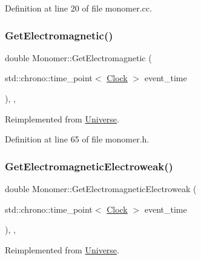 Definition at line 20 of file monomer.\+cc.

\mbox{\label{class_monomer_ad23f4829d66cb20401cc72a9d72ac320}} 
\subsubsection{\texorpdfstring{Get\+Electromagnetic()}{GetElectromagnetic()}}
{\footnotesize\ttfamily double Monomer\+::\+Get\+Electromagnetic (\begin{DoxyParamCaption}\item[{std\+::chrono\+::time\+\_\+point$<$ \mbox{\hyperlink{universe_8h_a0ef8d951d1ca5ab3cfaf7ab4c7a6fd80}{Clock}} $>$}]{event\+\_\+time }\end{DoxyParamCaption})\hspace{0.3cm}{\ttfamily [inline]}, {\ttfamily [final]}, {\ttfamily [virtual]}}



Reimplemented from \mbox{\hyperlink{class_universe_a63b850ef3f3394313353109d222bf5d1}{Universe}}.



Definition at line 65 of file monomer.\+h.

\mbox{\label{class_monomer_a9b270cd1293bc9635813ead284bd3881}} 
\subsubsection{\texorpdfstring{Get\+Electromagnetic\+Electroweak()}{GetElectromagneticElectroweak()}}
{\footnotesize\ttfamily double Monomer\+::\+Get\+Electromagnetic\+Electroweak (\begin{DoxyParamCaption}\item[{std\+::chrono\+::time\+\_\+point$<$ \mbox{\hyperlink{universe_8h_a0ef8d951d1ca5ab3cfaf7ab4c7a6fd80}{Clock}} $>$}]{event\+\_\+time }\end{DoxyParamCaption})\hspace{0.3cm}{\ttfamily [inline]}, {\ttfamily [final]}, {\ttfamily [virtual]}}



Reimplemented from \mbox{\hyperlink{class_universe_a9f099605c082e7fa755787a6a8cab7ba}{Universe}}.



